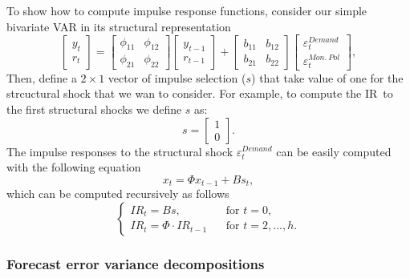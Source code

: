 \documentclass[10pt]{article}
\begin{document}
To show how to compute impulse response functions, consider our simple
bivariate VAR in its structural representation%
\begin{equation}
\left[
\begin{array}{c}
y_{t} \\
r_{t}%
\end{array}%
\right] =%
\begin{bmatrix}
\phi _{11} & \phi _{12} \\
\phi _{21} & \phi _{22}%
\end{bmatrix}%
\left[
\begin{array}{c}
y_{t-1} \\
r_{t-1}%
\end{array}%
\right] +\left[
\begin{array}{cc}
b_{11} & b_{12} \\
b_{21} & b_{22}%
\end{array}%
\right]
\begin{bmatrix}
\varepsilon _{t}^{Demand} \\
\varepsilon _{t}^{Mon.\ Pol}%
\end{bmatrix}%
,
\end{equation}%
Then, define a $2\times 1$ vector of impulse selection ($s$) that take value
of one for the strcuctural shock that we wan to consider. For example, to
compute the IR\ to the first structural shocks we define $s$ as:%
\begin{equation*}
s=\left[
\begin{array}{c}
1 \\
0%
\end{array}%
\right] .
\end{equation*}%
The impulse responses to the structural shock $\varepsilon _{t}^{Demand}$
can be easily computed with the following equation%
\begin{equation*}
x_{t}=\Phi x_{t-1}+Bs_{t},
\end{equation*}%
which can be computed recursively as follows%
\begin{equation*}
\left\{
\begin{array}{ll}
IR_{t}=Bs, & \ \ \ \ \text{for }t=0, \\
IR_{t}=\Phi \cdot IR_{t-1} & \ \ \ \ \text{for }t=2,...,h.%
\end{array}%
\right.
\end{equation*}

\subsubsection{Forecast error variance decompositions}
\end{document}
